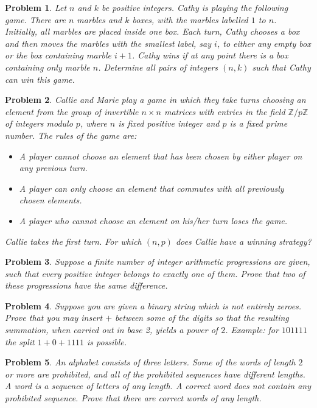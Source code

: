 \documentclass[12pt]{article}
\newtheorem{problem}{Problem}
\begin{document}
\begin{problem}
Let $n$ and $k$ be positive integers. Cathy is playing the following game. There are $n$ marbles and $k$ boxes, with the marbles labelled $1$ to $n$. Initially, all marbles are placed inside one box. Each turn, Cathy chooses a box and then moves the marbles with the smallest label, say $i$, to either any empty box or the box containing marble $i+1$. Cathy wins if at any point there is a box containing only marble $n$. Determine all pairs of integers $(n, k)$ such that Cathy can win this game.
\end{problem}

\begin{problem}
Callie and Marie play a game in which they take turns choosing an element from the group of invertible $n \times n$ matrices with entries in the field $\mathbb{Z}/p\mathbb{Z}$ of integers modulo $p$, where $n$ is fixed positive integer and $p$ is a fixed prime number. The rules of the game are:
\begin{itemize}
    \item A player cannot choose an element that has been chosen by either player on any previous turn.
    \item A player can only choose an element that commutes with all previously chosen elements.
    \item A player who cannot choose an element on his/her turn loses the game.
\end{itemize}
Callie takes the first turn. For which $(n, p)$ does Callie have a winning strategy?
\end{problem}

\begin{problem}
Suppose a finite number of integer arithmetic progressions are given, such that every positive integer belongs to exactly one of them. Prove that two of these progressions have the same difference.
\end{problem}

\begin{problem}
Suppose you are given a binary string which is not entirely zeroes. Prove that you may insert $+$ between some of the digits so that the resulting summation, when carried out in base 2, yields a power of $2$. Example: for $101111$ the split $1 + 0 + 1111$ is possible.
\end{problem}

\begin{problem}
An alphabet consists of three letters. Some of the words of length $2$ or more are prohibited, and all of the prohibited sequences have different lengths. A word is a sequence of letters of any length. A correct word does not contain any prohibited sequence. Prove that there are correct words of any length.
\end{problem}
\end{document}
